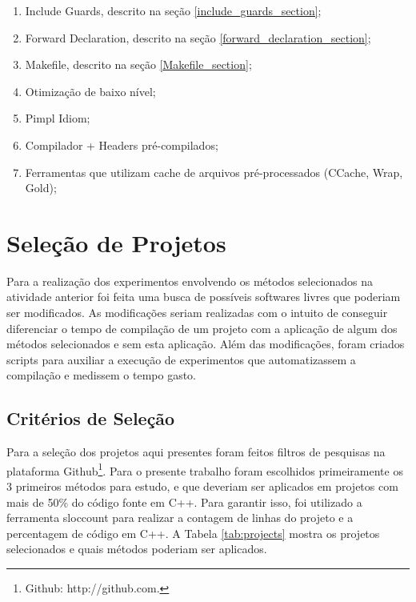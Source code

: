 \begin{enumerate}
	\item Include Guards, descrito na seção
 \ref{include_guards_section};
	\item Forward Declaration, descrito na seção
 \ref{forward_declaration_section};
	\item Makefile, descrito na seção
 \ref{Makefile_section};
	\item Otimização de baixo nível;
	\item Pimpl Idiom;
	\item Compilador + Headers pré-compilados;
	\item Ferramentas que utilizam cache de arquivos 
pré-processados (CCache, Wrap, Gold);
\end{enumerate}

\section{Seleção de Projetos}

Para a realização dos experimentos  envolvendo os métodos selecionados na
 atividade anterior foi feita uma busca de possíveis softwares livres que
 poderiam ser modificados.  As modificações seriam realizadas com o intuito
 de conseguir diferenciar o tempo de compilação de um projeto com a aplicação
 de algum dos métodos selecionados e sem  esta aplicação. Além das
 modificações, foram criados scripts para auxiliar a execução de experimentos
 que automatizassem a compilação e medissem o tempo gasto.

\subsection{Critérios de Seleção}


Para a seleção dos projetos aqui presentes foram feitos filtros de pesquisas
 na plataforma Github\footnote{Github: http://github.com.}. Para o presente
 trabalho foram escolhidos primeiramente os 3 primeiros métodos para estudo,
 e que deveriam ser aplicados em projetos com mais de 50\% do código fonte em
 C++. Para garantir isso, foi utilizado a ferramenta sloccount para realizar
 a contagem de linhas do projeto e a percentagem de código em C++.
 A Tabela \ref{tab:projects} mostra os projetos selecionados e quais métodos
 poderiam ser aplicados.


